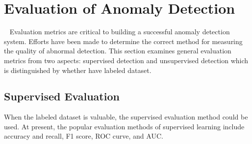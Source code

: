
\section{Evaluation of Anomaly Detection}~\label{sec:evaluate}
Evaluation metrics are critical to building a
successful anomaly detection system.
Efforts have been made to determine the
correct method for measuring the quality of abnormal detection.
This section examines general evaluation metrics from two aspects:
supervised detection
and unsupervised detection which is
distinguished by whether have labeled dataset.

\subsection{Supervised Evaluation}
When the labeled dataset is valuable,
the supervised evaluation method could be used.
At present,
the popular evaluation methods of supervised learning
include accuracy and recall,
F1 score,
ROC curve,
and AUC.

